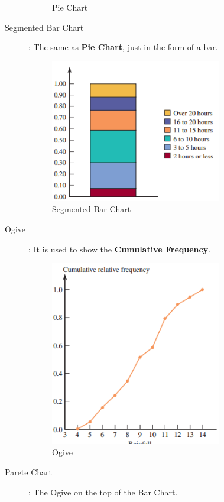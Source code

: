 \begin{description}
\begin{description}
\begin{figure}[H]
            \caption{Pie Chart}
            \label{pie chart}
        \end{figure}
        \item[Segmented Bar Chart]: The same as \textbf{Pie Chart}, just in the form of a bar.
        \begin{figure}[H]
            \centering
            \includegraphics[width=75mm]{segmented_bar_chart.png}
            \caption{Segmented Bar Chart}
            \label{segmented bar chart}
        \end{figure}
        \item[Ogive]: It is used to show the \textbf{Cumulative Frequency}.
        \begin{figure}[H]
            \centering
            \includegraphics[width=75mm]{crf.png}
            \caption{Ogive}
            \label{crf}
        \end{figure}
        \item[Parete Chart]: The Ogive on the top of the Bar Chart.
        

\end{description}
\end{description}

